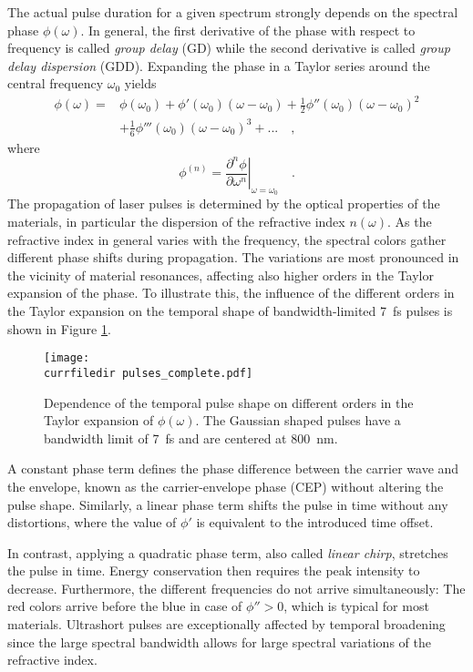 The actual pulse duration for a given spectrum strongly depends on the spectral phase $\phi(\omega)$. In general, the first derivative of the phase with respect to frequency is called \emph{group delay} (GD) while the second derivative is called \emph{group delay dispersion} (GDD). Expanding the phase in a Taylor series around the central frequency $\omega_{0}$ yields
\begin{equation}
	\begin{aligned}
	\phi(\omega) = & \phi(\omega_{0}) + \phi'(\omega_{0})(\omega-\omega_{0}) + \frac{1}{2} \phi''(\omega_{0})(\omega-\omega_{0})^{2} \\
	& +  \frac{1}{6} \phi'''(\omega_{0})(\omega-\omega_{0})^{3} + ... \quad ,
	\end{aligned}
\end{equation}
where
\begin{equation}
	\phi^{(n)} = \left. \frac{\partial^{n}\phi}{\partial \omega^{n}} \right\rvert_{\omega=\omega_{0}} \quad .
\end{equation}
The propagation of laser pulses is determined by the optical properties of the materials, in particular the dispersion of the refractive index $n(\omega)$. As the refractive index in general varies with the frequency, the spectral colors gather different phase shifts during propagation. The variations are most pronounced in the vicinity of material resonances, affecting also higher orders in the Taylor expansion of the phase. To illustrate this, the influence of the different orders in the Taylor expansion on the temporal shape of bandwidth-limited 7~fs pulses is shown in Figure \ref{fig:3-pulses}.

\begin{figure}
	\centering
	\texttt{[image: \\currfiledir pulses\_complete.pdf]}
\caption{Dependence of the temporal pulse shape on different orders in the Taylor expansion of $\phi(\omega)$. The Gaussian shaped pulses have a bandwidth limit of 7~fs and are centered at 800~nm. }
\label{fig:3-pulses}
\end{figure}



A constant phase term defines the phase difference between the carrier wave and the envelope, known as the carrier-envelope phase (CEP) without altering the pulse shape. Similarly, a linear phase term shifts the pulse in time without any distortions, where the value of $\phi'$ is equivalent to the introduced time offset.

In contrast, applying a quadratic phase term, also called \emph{linear chirp}, stretches the pulse in time. Energy conservation then requires the peak intensity to decrease. Furthermore, the different frequencies do not arrive simultaneously: The red colors arrive before the blue in case of $\phi''>0$, which is typical for most materials. Ultrashort pulses are exceptionally affected by temporal broadening since the large spectral bandwidth allows for large spectral variations of the refractive index. 

